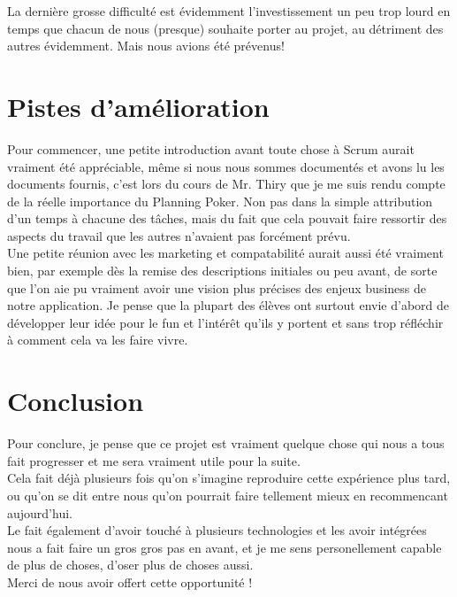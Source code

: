 \documentclass{report}
\begin{document}
	La dernière grosse difficulté est évidemment l'investissement un peu trop lourd en temps que chacun de nous (presque) souhaite porter au projet, au détriment des autres évidemment. Mais nous avions été prévenus!\\

\section{Pistes d'amélioration}

	Pour commencer, une petite introduction avant toute chose à Scrum aurait vraiment été appréciable, même si nous nous sommes documentés et avons lu les documents fournis, c'est lors du cours de Mr. Thiry que je me suis rendu compte de la réelle importance du Planning Poker. Non pas dans la simple attribution d'un temps à chacune des tâches, mais du fait que cela pouvait faire ressortir des aspects du travail que les autres n'avaient pas forcément prévu.\\

	Une petite réunion avec les marketing et compatabilité aurait aussi été vraiment bien, par exemple dès la remise des descriptions initiales ou peu avant, de sorte que l'on aie pu vraiment avoir une vision plus précises des enjeux business de notre application. Je pense que la plupart des élèves ont surtout envie d'abord de développer leur idée pour le fun et l'intérêt qu'ils y portent et sans trop réfléchir à comment cela va les faire vivre.\\


\section{Conclusion}

	Pour conclure, je pense que ce projet est vraiment quelque chose qui nous a tous fait progresser et me sera vraiment utile pour la suite.\\
	Cela fait déjà plusieurs fois qu'on s'imagine reproduire cette expérience plus tard, ou qu'on se dit entre nous qu'on pourrait faire tellement mieux en recommencant aujourd'hui.\\
	Le fait également d'avoir touché à plusieurs technologies et les avoir intégrées nous a fait faire un gros gros pas en avant, et je me sens personellement capable de plus de choses, d'oser plus de choses aussi.\\
	Merci de nous avoir offert cette opportunité !\\
\end{document}
